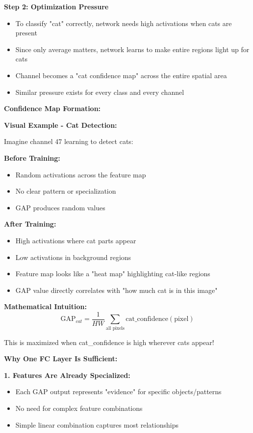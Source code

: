 \documentclass[12pt]{article}
\newcommand{\explanation}[1]{{\color{explanationcolor}#1}}
\begin{document}
\begin{enumerate}[(a)]
{{    \textbf{Step 2: Optimization Pressure}
    \begin{itemize}
        \item To classify "cat" correctly, network needs high activations when cats are present
        \item Since only average matters, network learns to make entire regions light up for cats
        \item Channel becomes a "cat confidence map" across the entire spatial area
        \item Similar pressure exists for every class and every channel
    \end{itemize}
    }
    
    \textbf{Confidence Map Formation:}
    
    \explanation{
    \textbf{Visual Example - Cat Detection:}
    
    Imagine channel 47 learning to detect cats:
    
    \textbf{Before Training:}
    \begin{itemize}
        \item Random activations across the feature map
        \item No clear pattern or specialization
        \item GAP produces random values
    \end{itemize}
    
    \textbf{After Training:}
    \begin{itemize}
        \item High activations where cat parts appear
        \item Low activations in background regions
        \item Feature map looks like a "heat map" highlighting cat-like regions
        \item GAP value directly correlates with "how much cat is in this image"
    \end{itemize}
    
    \textbf{Mathematical Intuition:}
    \[
    \text{GAP}_{cat} = \frac{1}{HW} \sum_{\text{all pixels}} \text{cat\_confidence}(\text{pixel})
    \]
    
    This is maximized when cat_confidence is high wherever cats appear!
    }
    
    \textbf{Why One FC Layer Is Sufficient:}
    
    \explanation{
    \textbf{1. Features Are Already Specialized:}
    \begin{itemize}
        \item Each GAP output represents "evidence" for specific objects/patterns
        \item No need for complex feature combinations
        \item Simple linear combination captures most relationships
    \end{itemize}
    
}}
\end{enumerate}
\end{document}
